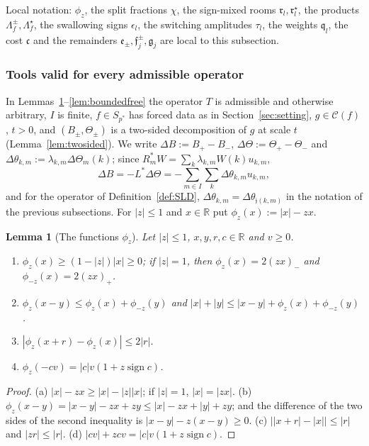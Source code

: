 \documentclass[10pt]{amsart}
\newtheorem{lemma}[theorem]{Lemma}
\theoremstyle{definition}
\theoremstyle{remark}
\newcommand{\sgn}{\operatorname{sign}}
\newcommand{\R}{\mathbb R}
\newcommand{\Cset}{\mathcal C}
\begin{document}
Local notation: $\phi_z$, the split fractions $\chi$, the sign-mixed rooms
$\mathfrak r_l,\mathfrak r^\star_l$, the products $\Lambda^\pm_f,
\Lambda^\star_f$, the swallowing signs $\epsilon_l$, the switching
amplitudes $\tau_l$, the weights $\mathfrak q_l$, the cost $\mathfrak c$
and the remainders $\mathfrak e_\pm,\mathfrak f^\pm_j,\mathfrak g_j$ are
local to this subsection.

\subsubsection*{Tools valid for every admissible operator}
In Lemmas~\ref{lem:phicalc}--\ref{lem:boundedfree} the operator $T$ is
admissible and otherwise arbitrary, $I$ is finite, $f\in S_{p^*}$ has
forced data as in Section~\ref{sec:setting}, $g\in\Cset(f)$, $t>0$, and
$(B_\pm,\Theta_\pm)$ is a two-sided decomposition of $g$ at scale $t$
(Lemma~\ref{lem:twosided}).  We write $\Delta B:=B_+-B_-$,
$\Delta\Theta:=\Theta_+-\Theta_-$ and
$\Delta\theta_{k,m}:=\lambda_{k,m}\Delta\Theta_m(k)$; since
$R_m^*W=\sum_k\lambda_{k,m}W(k)u_{k,m}$,
\begin{equation}\label{eq:DeltaB}
 \Delta B=-L^*\Delta\Theta=-\sum_{m\in I}\sum_k\Delta\theta_{k,m}u_{k,m},
\end{equation}
and for the operator of Definition~\ref{def:SLD}, $\Delta\theta_{k,m}=
\Delta\theta_{\mathfrak j(k,m)}$ in the notation of the previous subsections.
For $|z|\le1$ and $x\in\R$ put $\phi_z(x):=|x|-zx$.

\begin{lemma}[The functions $\phi_z$]\label{lem:phicalc}
Let $|z|\le1$, $x,y,r,c\in\R$ and $v\ge0$.
\begin{enumerate}
\item[(a)] $\phi_z(x)\ge(1-|z|)|x|\ge0$; if $|z|=1$, then $\phi_z(x)=2(zx)_-$
and $\phi_{-z}(x)=2(zx)_+$.
\item[(b)] $\phi_z(x-y)\le\phi_z(x)+\phi_{-z}(y)$ and
$|x|+|y|\le|x-y|+\phi_z(x)+\phi_{-z}(y)$.
\item[(c)] $|\phi_z(x+r)-\phi_z(x)|\le2|r|$.
\item[(d)] $\phi_z(-cv)=|c|v(1+z\sgn c)$.
\end{enumerate}
\end{lemma}

\begin{proof}
(a) $|x|-zx\ge|x|-|z||x|$; if $|z|=1$, $|x|=|zx|$.  (b) $\phi_z(x-y)=
|x-y|-zx+zy\le|x|-zx+|y|+zy$; and the difference of the two sides of the
second inequality is $|x-y|-z(x-y)\ge0$.  (c) $\big||x+r|-|x|\big|\le|r|$
and $|zr|\le|r|$.  (d) $|cv|+zcv=|c|v(1+z\sgn c)$.
\end{proof}
\end{document}
